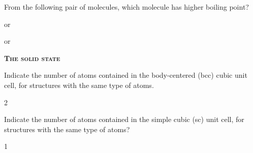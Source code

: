 \documentclass[main.tex]{subfiles}
\begin{document}
\begin{multicols*}{2}
\begin{question}[ID=\the\value{numA}]
From the following pair of molecules, which molecule has higher boiling point?
\begin{inparaenum}[(a)]
\item    {}  or   
\item     {}  or   
\end{inparaenum}
\end{question}
\begin{solution}
\begin{inparaenum}[(a)]
\item  {}
\item	 {} 
\end{inparaenum}\hspace{0.1cm}\end{solution}


{\raggedright\textsc{\textbf{The solid state }}\par}

\begin{question}[ID=\the\value{numA}]
Indicate the number of atoms  contained in the body-centered (bcc) cubic unit cell, for structures with the same type of atoms.
\end{question}
\begin{solution}
2
 \hspace{0.1cm}\end{solution}
\begin{question}[ID=\the\value{numA}]
Indicate the number of atoms  contained in the simple cubic (sc) unit cell, for structures with the same type of atoms?
\end{question}
\begin{solution}
1
 \hspace{0.1cm}\end{solution}


\end{multicols*}
\end{document}
